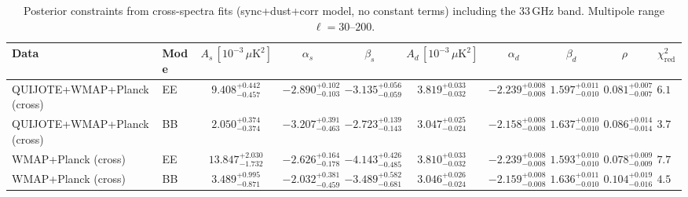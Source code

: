 \begin{table}[h]
\centering
\scriptsize
\setlength{\tabcolsep}{4pt}
\caption{Posterior constraints from cross-spectra fits (sync+dust+corr model, no constant terms) including the 33\,GHz band. Multipole range $\ell=30$--$200$.}
\label{tab:fit_results_cross_with33_sync_dust_cross}
\begin{tabular}{llcccccccc}
\toprule
Data & Mode & $A_s\,[10^{-3}\,\mu\mathrm{K}^2]$ & $\alpha_s$ & $\beta_s$ & $A_d\,[10^{-3}\,\mu\mathrm{K}^2]$ & $\alpha_d$ & $\beta_d$ & $\rho$ & $\chi^2_\mathrm{red}$ \\
\midrule
QUIJOTE+WMAP+Planck (cross) & EE & $9.408^{+0.442}_{-0.457}$ & $-2.890^{+0.102}_{-0.103}$ & $-3.135^{+0.056}_{-0.059}$ & $3.819^{+0.033}_{-0.032}$ & $-2.239^{+0.008}_{-0.008}$ & $1.597^{+0.011}_{-0.010}$ & $0.081^{+0.007}_{-0.007}$ & $6.11$ \\
QUIJOTE+WMAP+Planck (cross) & BB & $2.050^{+0.374}_{-0.374}$ & $-3.207^{+0.391}_{-0.463}$ & $-2.723^{+0.139}_{-0.143}$ & $3.047^{+0.025}_{-0.024}$ & $-2.158^{+0.008}_{-0.008}$ & $1.637^{+0.010}_{-0.010}$ & $0.086^{+0.014}_{-0.014}$ & $3.74$ \\
WMAP+Planck (cross) & EE & $13.847^{+2.030}_{-1.732}$ & $-2.626^{+0.164}_{-0.178}$ & $-4.143^{+0.426}_{-0.485}$ & $3.810^{+0.033}_{-0.032}$ & $-2.239^{+0.008}_{-0.008}$ & $1.593^{+0.010}_{-0.010}$ & $0.078^{+0.009}_{-0.009}$ & $7.79$ \\
WMAP+Planck (cross) & BB & $3.489^{+0.995}_{-0.871}$ & $-2.032^{+0.381}_{-0.459}$ & $-3.489^{+0.582}_{-0.681}$ & $3.046^{+0.026}_{-0.024}$ & $-2.159^{+0.008}_{-0.008}$ & $1.636^{+0.011}_{-0.010}$ & $0.104^{+0.019}_{-0.016}$ & $4.52$ \\
\bottomrule
\end{tabular}
\end{table}
